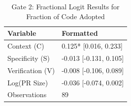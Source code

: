 \begin{table}
\caption{Gate 2: Fractional Logit Results for Fraction of Code Adopted}
\label{tab:gate2}
\begin{tabular}{ll}
\toprule
Variable & Formatted \\
\midrule
Context (C) & 0.125* [0.016, 0.233] \\
Specificity (S) & -0.013 [-0.131, 0.105] \\
Verification (V) & -0.008 [-0.106, 0.089] \\
Log(PR Size) & -0.036 [-0.074, 0.002] \\
Observations & 89 \\
\bottomrule
\end{tabular}
\end{table}
